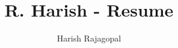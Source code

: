 \documentclass[10pt, a4paper]{article}
\title{R. Harish - Resume}
\author{Harish Rajagopal}
\begin{document}
    
    
    \begin{multicols}{2}
        
        
        
        
    \end{multicols}
    
\end{document}

